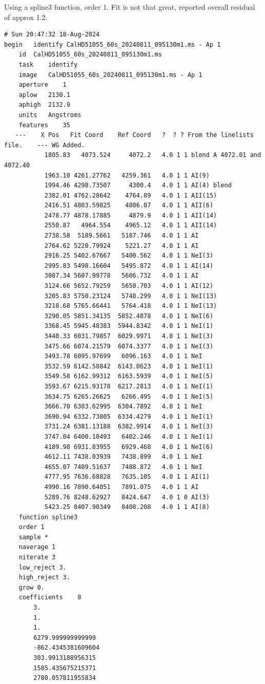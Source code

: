 Using a spline3 function, order 1. Fit is not that great, reported overall
residual of approx 1.2.

\begingroup \fontsize{10pt}{10pt}
\selectfont
\begin{verbatim} 
# Sun 20:47:32 18-Aug-2024
begin	identify CalHD51055_60s_20240811_095130m1.ms - Ap 1
	id	CalHD51055_60s_20240811_095130m1.ms
	task	identify
	image	CalHD51055_60s_20240811_095130m1.ms - Ap 1
	aperture	1
	aplow	2130.1
	aphigh	2132.9
	units	Angstroms
	features	35
   ---    X Pos   Fit Coord    Ref Coord   ?  ? ? From the linelists file.    --- WG Added.
	       1805.83   4073.524     4072.2   4.0 1 1 blend A 4072.01 and 4072.40
	       1963.10 4261.27762   4259.361   4.0 1 1 AI(9)
	       1994.46 4298.73507     4300.4   4.0 1 1 AI(4) blend
	       2382.01 4762.28642    4764.89   4.0 1 1 AII(15)
	       2416.51 4803.59825    4806.07   4.0 1 1 AII(6)
	       2478.77 4878.17885     4879.9   4.0 1 1 AII(14)
	       2550.87   4964.554    4965.12   4.0 1 1 AII(14)
	       2738.58  5189.5661   5187.746   4.0 1 1 AI
	       2764.62 5220.79924    5221.27   4.0 1 1 AI
	       2916.25 5402.67667   5400.562   4.0 1 1 NeI(3)
	       2995.83 5498.16604   5495.872   4.0 1 1 AI(14)
	       3087.34 5607.99778   5606.732   4.0 1 1 AI
	       3124.66 5652.79259   5650.703   4.0 1 1 AI(12)
	       3205.83 5750.23124   5748.299   4.0 1 1 NeI(13)
	       3218.68 5765.66441   5764.418   4.0 1 1 NeI(13)
	       3290.05 5851.34135  5852.4878   4.0 1 1 NeI(6)
	       3368.45 5945.48383  5944.8342   4.0 1 1 NeI(1)
	       3440.33 6031.79857  6029.9971   4.0 1 1 NeI(3)
	       3475.66 6074.21579  6074.3377   4.0 1 1 NeI(3)
	       3493.78 6095.97699   6096.163   4.0 1 1 NeI
	       3532.59 6142.58842  6143.0623   4.0 1 1 NeI(1)
	       3549.58 6162.99312  6163.5939   4.0 1 1 NeI(5)
	       3593.67 6215.93178  6217.2813   4.0 1 1 NeI(1)
	       3634.75 6265.26625   6266.495   4.0 1 1 NeI(5)
	       3666.70 6303.62995  6304.7892   4.0 1 1 NeI
	       3690.94 6332.73805  6334.4279   4.0 1 1 NeI(1)
	       3731.24 6381.13188  6382.9914   4.0 1 1 NeI(3)
	       3747.04 6400.10493   6402.246   4.0 1 1 NeI(1)
	       4189.98 6931.83955   6929.468   4.0 1 1 NeI(6)
	       4612.11 7438.03939   7438.899   4.0 1 1 NeI
	       4655.07 7489.51637   7488.872   4.0 1 1 NeI
	       4777.95 7636.68828   7635.105   4.0 1 1 AI(1)
	       4990.16 7890.64051   7891.075   4.0 1 1 AI
	       5289.76 8248.62927   8424.647   4.0 1 0 AI(3)
	       5423.25 8407.90349   8408.208   4.0 1 1 AI(8)
	function spline3
	order 1
	sample *
	naverage 1
	niterate 3
	low_reject 3.
	high_reject 3.
	grow 0.
	coefficients	8
		3.
		1.
		1.
		6279.999999999999
		-862.4345381609604
		303.9913188956315
		1585.435675215371
		2780.057811955834

\end{verbatim}
\endgroup


